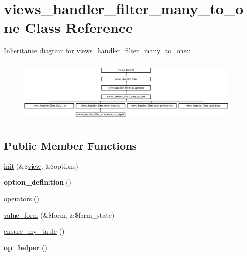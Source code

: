 \hypertarget{classviews__handler__filter__many__to__one}{
\section{views\_\-handler\_\-filter\_\-many\_\-to\_\-one Class Reference}
\label{classviews__handler__filter__many__to__one}
}
Inheritance diagram for views\_\-handler\_\-filter\_\-many\_\-to\_\-one::\begin{figure}[H]
\begin{center}
\leavevmode
\includegraphics[height=3.25581cm]{classviews__handler__filter__many__to__one}
\end{center}
\end{figure}
\subsection*{Public Member Functions}
\begin{DoxyCompactItemize}
\item 
\hyperlink{classviews__handler__filter__many__to__one_aecb4fb4dbe4f93d157cb8a7b699fea22}{init} (\&\$\hyperlink{classview}{view}, \&\$options)
\item 
\hypertarget{classviews__handler__filter__many__to__one_ae72e4f1ca6a64f22737671275d8d7a92}{
{\bfseries option\_\-definition} ()}
\label{classviews__handler__filter__many__to__one_ae72e4f1ca6a64f22737671275d8d7a92}

\item 
\hyperlink{classviews__handler__filter__many__to__one_ae397d071d9f55b4053b88f01572e700f}{operators} ()
\item 
\hyperlink{classviews__handler__filter__many__to__one_a6c5e3bbabc2ed73418f835195c10f451}{value\_\-form} (\&\$form, \&\$form\_\-state)
\item 
\hyperlink{classviews__handler__filter__many__to__one_a6ab5d3416cca7a6f5e59584071758673}{ensure\_\-my\_\-table} ()
\item 
\hypertarget{classviews__handler__filter__many__to__one_af618d87468cd54769de0048630cc9b7e}{
{\bfseries op\_\-helper} ()}
\label{classviews__handler__filter__many__to__one_af618d87468cd54769de0048630cc9b7e}

\end{DoxyCompactItemize}

